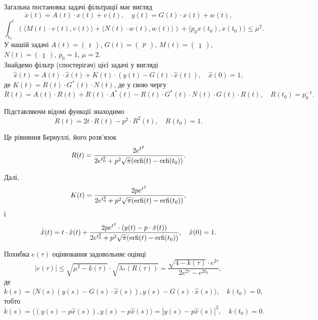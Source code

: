 \begin{solution}
	Загальна постановка задачі фільтрації має вигляд \[ \dot x (t)= A (t) \cdot x (t)+ v (t), \quad y (t)= G (t) \cdot x(t) + w(t),\] \[\int_{t_0}^t ( \langle M(t) \cdot v(t), v(t)\rangle + \langle N(t) \cdot w(t), w(t)\rangle )  + \langle p_0 x(t_0), x(t_0) \rangle \le \mu^2. \] У нашій задачі $A (t)= \begin{pmatrix} t \end{pmatrix}$, $G (t)= \begin{pmatrix} p \end{pmatrix}$, $M (t)= \begin{pmatrix} 1 \end{pmatrix}$, $N (t)= \begin{pmatrix} 1 \end{pmatrix}$, $p_0 = 1$, $\mu = 2$. \\

    Знайдемо фільтр (спостерігач) цієї задачі у вигляді \[ \dot{\hat{x}} (t) = A (t) \cdot \hat x (t) + K (t) \cdot (y (t) - G (t) \cdot \hat x (t)), \quad \hat x(0) = 1, \] де $K (t)= R (t) \cdot G^* (t) \cdot N(t)$, де у свою чергу \[\dot R (t)= A (t) \cdot R (t)+ R (t) \cdot A^* (t)- R (t) \cdot G^* (t) \cdot N (t) \cdot G (t) \cdot R(t), \quad R(t_0) = p_0^{-1}. \]

    Підставляючи відомі функції знаходимо \[\dot R (t)= 2 t \cdot R(t) - p^2 \cdot R^2(t), \quad R(t_0) = 1. \]

    Це рівняння Бернуллі, його розв'язок \[ R(t) = \frac{2 e^{t^2}}{2 e^{t_0^2} + p^2 \sqrt{\pi} (\operatorname{erfi}(t) - \operatorname{erfi}(t_0))}. \]

    Далі, \[ K(t) = \frac{2 p e^{t^2}}{2 e^{t_0^2} + p^2 \sqrt{\pi} (\operatorname{erfi}(t) - \operatorname{erfi}(t_0))}, \] і \[ \dot{\hat{x}} (t) = t \cdot \hat x (t) + \frac{2 p e^{t^2} \cdot (y (t) - p \cdot \hat x (t))}{2 e^{t_0^2} + p^2 \sqrt{\pi} (\operatorname{erfi}(t) - \operatorname{erfi}(t_0))}, \quad \hat x(0) = 1. \]

    Похибка $e(\tau)$ оцінювання задовольняє оцінці \[ |e(\tau)| \le \sqrt{\mu^2-k(\tau)} \cdot \sqrt{\lambda_* (R(\tau))} = \frac{ \sqrt{4 - k(\tau)} \cdot e^{2\tau}}{2e^{2\tau}-e^{2t_0}},\] де \[ \dot k (s) = \langle N(s) (y(s) - G(s) \cdot \hat x(s)), y(s) - G(s) \cdot \hat x(s)\rangle, \quad k(t_0) = 0, \] тобто \[ \dot k (s) = \langle (y(s) - p \hat x(s)), y(s) - p \hat x(s)\rangle = |y(s) - p \hat x(s)|^2, \quad k(t_0) = 0. \]
\end{solution}

\begin{problem}
\end{problem}

\begin{solution}
\end{solution}